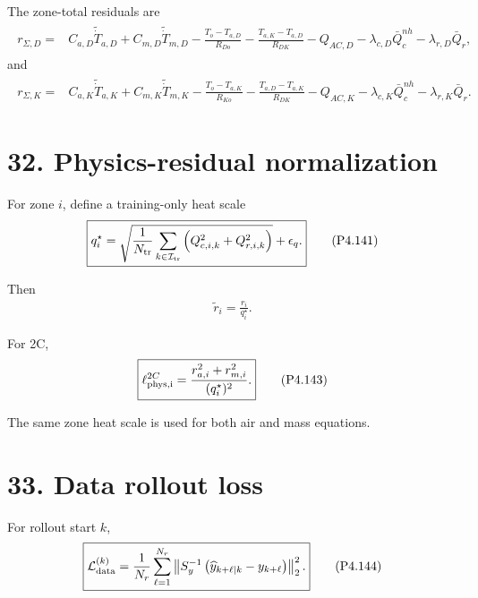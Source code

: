 \documentclass[11pt]{article}
\begin{document}
The zone-total residuals are
\begin{align}
\boxed{
\begin{aligned}
r_{\Sigma,D}
={}&
C_{a,D}\widetilde{\dot T}_{a,D}
+
C_{m,D}\widetilde{\dot T}_{m,D}
-
\frac{T_o-T_{a,D}}{R_{Do}}
-
\frac{T_{a,K}-T_{a,D}}{R_{DK}}
-
Q_{AC,D}
-
\lambda_{c,D}\bar Q_c^{nh}
-
\lambda_{r,D}\bar Q_r,
\end{aligned}
}
\tag{P4.139}
\end{align}
and
\begin{align}
\boxed{
\begin{aligned}
r_{\Sigma,K}
={}&
C_{a,K}\widetilde{\dot T}_{a,K}
+
C_{m,K}\widetilde{\dot T}_{m,K}
-
\frac{T_o-T_{a,K}}{R_{Ko}}
-
\frac{T_{a,D}-T_{a,K}}{R_{DK}}
-
Q_{AC,K}
-
\lambda_{c,K}\bar Q_c^{nh}
-
\lambda_{r,K}\bar Q_r.
\end{aligned}
}
\tag{P4.140}
\end{align}

\section*{32. Physics-residual normalization}

For zone \(i\), define a training-only heat scale
\begin{align}
\boxed{
q_i^\star
=
\sqrt{
\frac{1}{N_{\rm tr}}
\sum_{k\in\mathcal I_{\rm tr}}
\left(
Q_{c,i,k}^2+Q_{r,i,k}^2
\right)
}
+
\epsilon_q.
}
\tag{P4.141}
\end{align}

Then
\begin{align}
\boxed{
\widetilde r_i=\frac{r_i}{q_i^\star}.
}
\tag{P4.142}
\end{align}

For 2C,
\begin{align}
\boxed{
\ell_{\rm phys,i}^{2C}
=
\frac{r_{a,i}^2+r_{m,i}^2}{(q_i^\star)^2}.
}
\tag{P4.143}
\end{align}

The same zone heat scale is used for both air and mass equations.

\section*{33. Data rollout loss}

For rollout start \(k\),
\begin{align}
\boxed{
\mathcal L_{\rm data}^{(k)}
=
\frac{1}{N_r}
\sum_{\ell=1}^{N_r}
\left\|
S_y^{-1}
\left(
\widehat y_{k+\ell|k}-y_{k+\ell}
\right)
\right\|_2^2.
}
\tag{P4.144}
\end{align}
\end{document}
